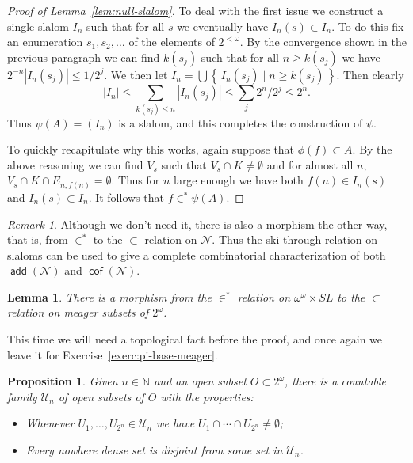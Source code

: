 \documentclass[11pt,oneside]{amsbook}
\newcommand{\set}[1]{\left\{\,#1\,\right\}}
\newcommand{\NN}{\mathbb N}
\newcommand{\Null}{\mathcal N}
\DeclareMathOperator{\add}{\mathsf{add}}
\DeclareMathOperator{\cof}{\mathsf{cof}}
\theoremstyle{definition}
\theoremstyle{plain}
\newtheorem{lem}[thm]{Lemma}
\newtheorem{prop}[thm]{Proposition}
\theoremstyle{definition}
\theoremstyle{remark}
\newtheorem{rem}[thm]{Remark}
\begin{document}
\begin{proof}[Proof of Lemma~\ref{lem:null-slalom}]
  To deal with the first issue we construct a single slalom $I_n$ such that for all $s$ we eventually have $I_n(s)\subset I_n$. To do this fix an enumeration $s_1,s_2,\ldots$ of the elements of $2^{<\omega}$. By the convergence shown in the previous paragraph we can find $k(s_j)$ such that for all $n\geq k(s_j)$ we have $2^{-n}|I_n(s_j)|\leq1/2^j$. We then let $I_n=\bigcup\set{I_n(s_j)\mid n\geq k(s_j)}$. Then clearly
  \[|I_n|\leq\sum_{k(s_j)\leq n}|I_n(s_j)|\leq\sum_{j}2^n/2^j\leq2^n\text{.}
  \]
  Thus $\psi(A)=(I_n)$ is a slalom, and this completes the construction of $\psi$.

  To quickly recapitulate why this works, again suppose that $\phi(f)\subset A$. By the above reasoning we can find $V_s$ such that $V_s\cap K\neq\emptyset$ and for almost all $n$, $V_s\cap K\cap E_{n,f(n)}=\emptyset$. Thus for $n$ large enough we have both $f(n)\in I_n(s)$ and $I_n(s)\subset I_n$. It follows that $f\in^*\psi(A)$.
\end{proof}

\begin{rem}
  Although we don't need it, there is also a morphism the other way, that is, from $\in^*$ to the $\subset$ relation on $\Null$. Thus the ski-through relation on slaloms can be used to give a complete combinatorial characterization of both $\add(\Null)$ and $\cof(\Null)$.
\end{rem}

\begin{lem}
  \label{lem:slalom-meager}
  There is a morphism from the $\in^*$ relation on $\omega^\omega\times SL$ to the $\subset$ relation on meager subsets of $2^\omega$.
\end{lem}

This time we will need a topological fact before the proof, and once again we leave it for Exercise~\ref{exerc:pi-base-meager}.

\begin{prop}
  \label{prop:pi-base-meager}
  Given $n\in\NN$ and an open subset $O\subset2^\omega$, there is a countable family $\mathcal U_n$ of open subsets of $O$ with the properties:
  \begin{itemize}
  \item Whenever $U_1,\ldots,U_{2^n}\in\mathcal U_n$ we have $U_1\cap\cdots\cap U_{2^n}\neq\emptyset$;
  \item Every nowhere dense set is disjoint from some set in $\mathcal U_n$.
  \end{itemize}
\end{prop}
\end{document}

